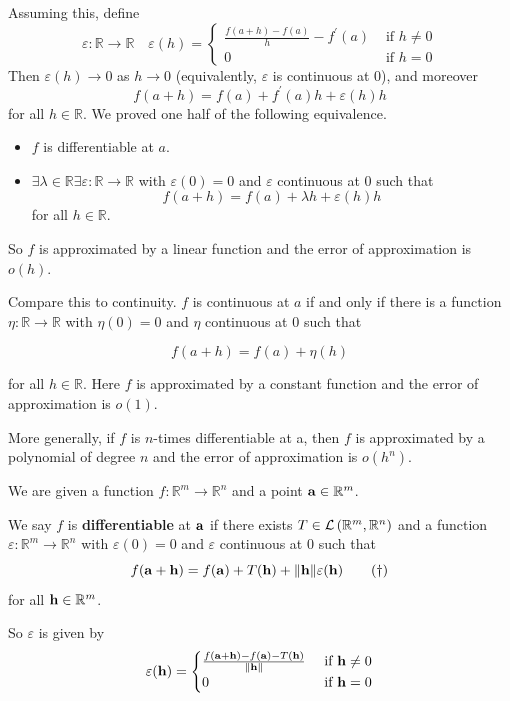 \documentclass[a4paper,11pt]{article}
\begin{document}
Assuming this, define
$$
\varepsilon: \mathbb{R} \rightarrow \mathbb{R} \quad \varepsilon(h)= \begin{cases}\frac{f(a+h)-f(a)}{h}-f^{\prime}(a) & \text { if } h \neq 0 \\ 0 & \text { if } h=0\end{cases}
$$
Then $\varepsilon(h) \rightarrow 0$ as $h \rightarrow 0$ (equivalently, $\varepsilon$ is continuous at 0), and moreover
$$
f(a+h)=f(a)+f^{\prime}(a) h+\varepsilon(h) h
$$
for all $h \in \mathbb{R}$. We proved one half of the following equivalence.

\begin{itemize}
  \item $f$ is differentiable at $a$.

  \item $\exists \lambda \in \mathbb{R} \exists \varepsilon: \mathbb{R} \rightarrow \mathbb{R}$ with $\varepsilon(0)=0$ and $\varepsilon$ continuous at 0 such that
  $$
  f(a+h)=f(a)+\lambda h+\varepsilon(h) h
  $$
  for all $h \in \mathbb{R}$.
\end{itemize}


So $f$ is approximated by a linear function and the error of approximation is $o(h)$.

Compare this to continuity. $f$ is continuous at $a$ if and only if there is a function $\eta: \mathbb{R} \rightarrow \mathbb{R}$ with $\eta(0)=0$ and $\eta$ continuous at 0 such that

$$
f(a+h)=f(a)+\eta(h)
$$

for all $h \in \mathbb{R}$. Here $f$ is approximated by a constant function and the error of approximation is $o(1)$.

More generally, if $f$ is $n$-times differentiable at a, then $f$ is approximated by a polynomial of degree $n$ and the error of approximation is $o(h^{n})$.

\begin{definition}
    We are given a function $f: \mathbb{R}^{m} \rightarrow \mathbb{R}^{n}$ and a point ${\bf a} \in \mathbb{R}^{m}$.

    We say $f$ is \textbf{differentiable} at ${\bf a}$ if there exists $T \in {\mathcal{L}}\left(\mathbb{R}^{m}, \mathbb{R}^{n}\right)$ and a function $\varepsilon: \mathbb{R}^{m} \rightarrow \mathbb{R}^{n}$ with $\varepsilon(0)=0$ and $\varepsilon$ continuous at 0 such that
    \[
    f({\bf a}+{\bf h})=f({\bf a})+T({\bf h})+\|{\bf h}\| \varepsilon({\bf h})\tag{$\dagger$}
    \]
    for all ${\bf h} \in \mathbb{R}^{m}$.
\end{definition}
So $\varepsilon$ is given by
$$
\varepsilon({\bf h})= \begin{cases}\frac{f({\bf a}+{\bf h})-f({\bf a})-T({\bf h})}{\|{\bf h}\|} & \text { if } {\bf h} \neq 0 \\ 0 & \text { if } {\bf h}=0\end{cases}
$$
\end{document}
